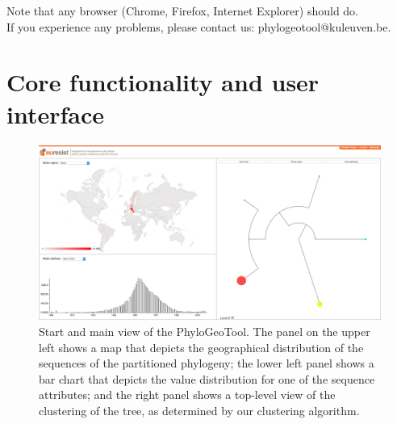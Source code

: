 \documentclass[a4paper, 11pt]{article} %
\begin{document}
Note that any browser (Chrome, Firefox, Internet Explorer) should do.\\

\noindent If you experience any problems, please contact us: phylogeotool@kuleuven.be.


\section{Core functionality and user interface}
\label{sec:core_func_user_interface}
\begin{figure}[H]
\centering
\includegraphics[scale=0.1875]{images/defaultScreenshot.png}
\vspace{-0.75cm}
\caption{Start and main view of the PhyloGeoTool. 
The panel on the upper left shows a map that depicts the geographical distribution of the sequences of the partitioned phylogeny; the lower left panel shows a bar chart that depicts the value distribution for one of the sequence attributes; and the right panel shows a top-level view of the clustering of the tree, as determined by our clustering algorithm. 
}
\label{fig:initialview}
\end{figure}
\end{document}
